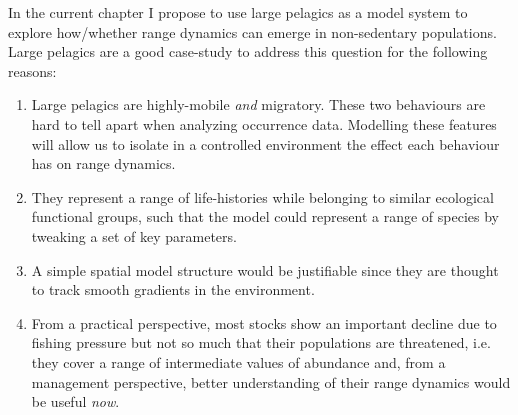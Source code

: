 \documentclass{article}
\begin{document}
In the current chapter I propose to use large pelagics as a model system to
explore how/whether range dynamics can emerge in non-sedentary
populations. Large pelagics are a good case-study to address this
question for the following reasons:
\begin{enumerate}[--]
\item Large pelagics are highly-mobile \emph{and} migratory. These two
behaviours are hard to tell apart when analyzing occurrence
data. Modelling these features will allow us to isolate in a
controlled environment the effect each behaviour has on range dynamics.
\item They represent a range of
life-histories while belonging to similar ecological functional
groups, such that the model could represent a range of species by
tweaking a set of key parameters.
\item A simple spatial model structure would be justifiable since they
  are thought to track smooth gradients in the environment.
\item From a practical perspective, most stocks show an
important decline due to fishing pressure but not so much that their
populations are threatened, i.e. they cover a range of intermediate
values of abundance and, from a management perspective, better
understanding of their range dynamics would be useful \emph{now}.
\end{enumerate}
\end{document}
